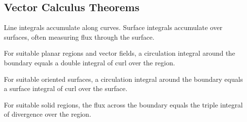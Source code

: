 \subsection*{Vector Calculus Theorems}

\begin{definition*}
Line integrals accumulate along curves. Surface integrals accumulate over
surfaces, often measuring flux through the surface.
\end{definition*}

\begin{theorem*}
For suitable planar regions and vector fields, a circulation integral around
the boundary equals a double integral of curl over the region.
\end{theorem*}

\begin{theorem*}
For suitable oriented surfaces, a circulation integral around the boundary
equals a surface integral of curl over the surface.
\end{theorem*}

\begin{theorem*}
For suitable solid regions, the flux across the boundary equals the triple
integral of divergence over the region.
\end{theorem*}
